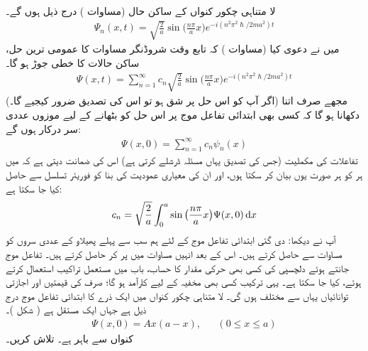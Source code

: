  لا متناہی چکور کنواں کے ساکن حال (مساوات  ) درج ذیل ہوں گے۔ 
 \begin{align}
\Psi_{n}(x,t)=\sqrt{\frac{2}{a}}\sin\big(\frac{n\pi}{a}x\big)e^{-i(n^{2}\pi^{2}\hslash/2ma^{2})t}
\end{align}
 میں نے دعوی  کیا (مساوات  ) کہ تابع وقت شروڈنگر مساوات کا عمومی ترین حل، ساکن حالات کا خطی جوڑ ہو گا۔
\begin{align}\label{مساوات_شروڈنگر_ساکن_حالات_کا_مجموعہ}
\Psi(x,t)=\sum_{n=1}^{\infty}c_n\sqrt{\frac{2}{a}}\sin\big(\frac{n\pi}{a}x\big)e^{-i(n^{2}\pi^{2}\hslash/2ma^{2})t}
\end{align}  
 (اگر آپ کو اس حل پر شق ہو تو اس کی تصدیق ضرور کیجیے گا۔) مجھے صرف اتنا دکھانا ہو گا کہ کسی بھی ابتدائی تفاعل موج    پر اس حل کو   بٹھانے کے لیے  موزوں  عددی سر  درکار ہوں گے:
\begin{align*}
\Psi(x,0)=\sum_{n=1}^{\infty}c_{n}\psi_{n}(x)
\end{align*}
تفاعلات   کی مکملیت (جس کی تصدیق یہاں مسئلہ ڈرشلے کرتی ہے) اس کی ضمانت دیتی ہے کہ میں ہر    کو ہر صورت یوں بیان کر سکتا ہوں، اور ان کی معیاری عمودیت کی بنا    کو فوریئر تسلسل سے حاصل کیا جا سکتا ہے: 
\begin{align}\label{مساوات_شروڈنگر_عددی_سروں}
c_{n}=\sqrt{\frac{2}{a}}\int_{0}^{a}\sin\big(\frac{n\pi}{a}x\big)\Psi(x,0)\dif{x}
\end{align}
آپ نے دیکھا: دی گئی ابتدائی تفاعل موج  کے لئے ہم سب سے پہلے پھیلاو کے عددی سروں   کو مساوات  سے حاصل کرتے ہیں۔   اس کے بعد انہیں
 مساوات   میں پر کر  حاصل کرتے ہیں۔ تفاعل موج جانتے ہوئے  دلچسپی کی کسی بھی حرکی مقدار   کا حساب، باب   میں مستعمل تراکیب استعمال کرتے ہوئے، کیا جا سکتا ہے۔ یہی ترکیب کسی بھی مخفیہ کے لیے کارآمد ہو گا؛  صرف    کی  قیمتیں اور اجازتی توانائیاں یہاں سے مختلف  ہوں گی۔
لا متناہی چکور کنواں میں ایک ذرے کا ابتدائی تفاعل موج درج ذیل ہے جہاں  ایک مستقل ہے ( شکل  )۔
\begin{align*}
\Psi(x,0)=Ax(a-x),&& (0\le x\le  a)
\end{align*}
 کنواں سے باہر   ہے۔   تلاش کریں۔ 

